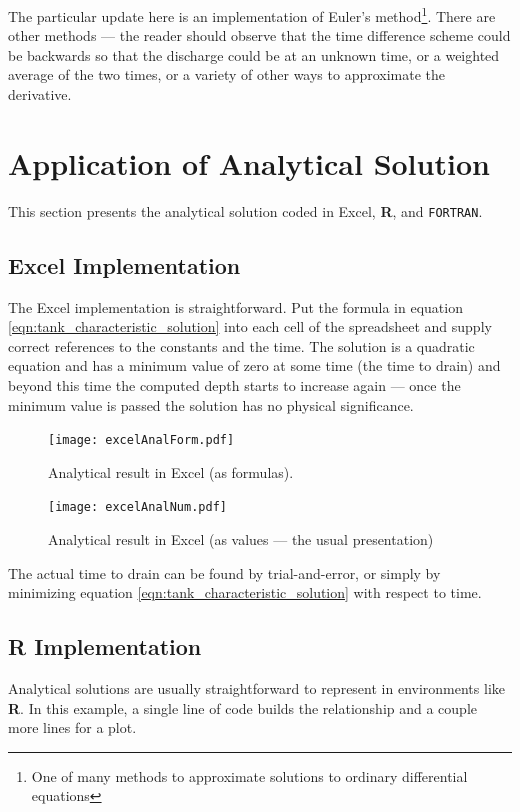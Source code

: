 \documentclass[12pt]{article}
\begin{document}
The particular update here is an implementation of Euler's method\footnote{One of many methods to approximate solutions to ordinary differential equations}.  There are other methods --- the reader should observe that the time difference scheme could be backwards so that the discharge could be at an unknown time, or a weighted average of the two times, or a variety of other ways to approximate the derivative.

\section{Application of Analytical Solution}
This section presents the analytical solution coded in Excel, \textbf{R}, and \texttt{FORTRAN}.  
\subsection{Excel Implementation}
The Excel implementation is straightforward.  Put the formula in equation \ref{eqn:tank_characteristic_solution} into each cell of the spreadsheet and supply correct references to the constants and the time.  The solution is a quadratic equation and has a minimum value of zero at some time (the time to drain) and beyond this time the computed depth starts to increase again --- once the minimum value is passed the solution has no physical significance.

\begin{figure}[h!] %
   \centering
   \texttt{[image: excelAnalForm.pdf]} 
   \caption{Analytical result in Excel (as formulas).}
   \label{fig:excelAnalForm}
\end{figure}

\begin{figure}[h!] %
   \centering
   \texttt{[image: excelAnalNum.pdf]} 
   \caption{Analytical result in Excel (as values --- the usual presentation)}
   \label{fig:excelAnalNum}
\end{figure}

The actual time to drain can be found by trial-and-error, or simply by minimizing equation \ref{eqn:tank_characteristic_solution} with respect to time.

\subsection{\textbf{R} Implementation}
Analytical solutions are usually straightforward to represent in environments like \textbf{R}.  In this example, a single line of code builds the relationship and a couple more lines for a plot.
\end{document}
